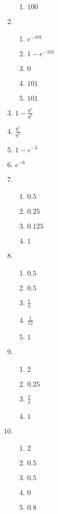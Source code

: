 \begin{multicols}{2}
\begin{enumerate}
\begin{enumerate}
				\item $100$
			\end{enumerate}
	\item
			\begin{enumerate}
				\item $e^{-101}$
				\item $1 - e^{-101}$
				\item $0$
				\item $101$
				\item $101$
			\end{enumerate}
	\item $1 - \frac{8^5}{9^5}$
	\item $\frac{8^5}{9^5}$
	\item $1 - e^{-3}$
	\item $e^{-6}$
	\item
			\begin{enumerate}
				\item $0.5$
				\item $0.25$
				\item $0.125$
				\item $1$
			\end{enumerate}
	\item
			\begin{enumerate}
				\item $0.5$
				\item $0.5$
				\item $\frac{1}{3}$
				\item $\frac{1}{12}$
				\item $1$
			\end{enumerate}
	\item
			\begin{enumerate}
				\item $2$
				\item $0.25$
				\item $\frac{3}{4}$
				\item $1$
			\end{enumerate}
	\item
			\begin{enumerate}
				\item $2$
				\item $0.5$
				\item $0.5$
				\item $0$
				\item $0.8$
			\end{enumerate}
\end{enumerate}
\end{multicols}



